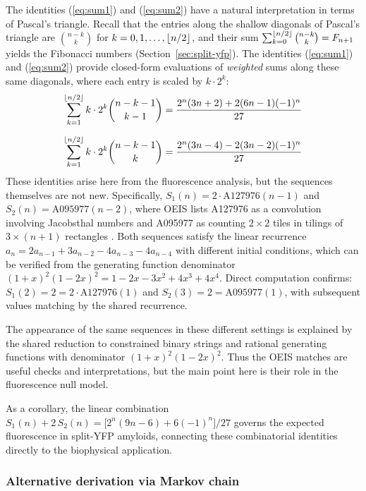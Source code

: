 \documentclass[11pt]{article}
\DeclarePairedDelimiter\floor{\lfloor}{\rfloor}
\begin{document}
The identities (\ref{eq:sum1}) and (\ref{eq:sum2}) have a natural interpretation in terms of Pascal's triangle. Recall that the entries along the shallow diagonals of Pascal's triangle are $\binom{n-k}{k}$ for $k = 0, 1, \ldots, \floor{n/2}$, and their sum $\sum_{k=0}^{\floor{n/2}} \binom{n-k}{k} = F_{n+1}$ yields the Fibonacci numbers (Section~\ref{sec:split-yfp}). The identities (\ref{eq:sum1}) and (\ref{eq:sum2}) provide closed-form evaluations of \textit{weighted} sums along these same diagonals, where each entry is scaled by $k \cdot 2^k$:
\begin{align}
\sum_{k=1}^{\floor{n/2}} k \cdot 2^k \binom{n-k-1}{k-1} &= \frac{2^n(3n+2) + 2(6n-1)(-1)^n}{27} \label{eq:diag1} \\[6pt]
\sum_{k=1}^{\floor{n/2}} k \cdot 2^k \binom{n-k-1}{k} &= \frac{2^n(3n-4) - 2(3n-2)(-1)^n}{27} \label{eq:diag2}
\end{align}
These identities arise here from the fluorescence analysis, but the sequences themselves are not new. Specifically, $S_1(n) = 2 \cdot \text{A127976}(n-1)$ and $S_2(n) = \text{A095977}(n-2)$, where OEIS lists A127976 as a convolution involving Jacobsthal numbers and A095977 as counting $2 \times 2$ tiles in tilings of $3 \times (n+1)$ rectangles \cite{oeisA127976,oeisA095977}. Both sequences satisfy the linear recurrence $a_n = 2a_{n-1} + 3a_{n-2} - 4a_{n-3} - 4a_{n-4}$ with different initial conditions, which can be verified from the generating function denominator $(1+x)^2(1-2x)^2 = 1 - 2x - 3x^2 + 4x^3 + 4x^4$. Direct computation confirms: $S_1(2) = 2 = 2 \cdot \text{A127976}(1)$ and $S_2(3) = 2 = \text{A095977}(1)$, with subsequent values matching by the shared recurrence.

The appearance of the same sequences in these different settings is explained by the shared reduction to constrained binary strings and rational generating functions with denominator $(1+x)^2(1-2x)^2$. Thus the OEIS matches are useful checks and interpretations, but the main point here is their role in the fluorescence null model.

As a corollary, the linear combination $S_1(n) + 2\,S_2(n) = \bigl[2^n(9n-6) + 6(-1)^n\bigr]/27$ governs the expected fluorescence in split-YFP amyloids, connecting these combinatorial identities directly to the biophysical application.

\subsubsection{Alternative derivation via Markov chain}
\end{document}
